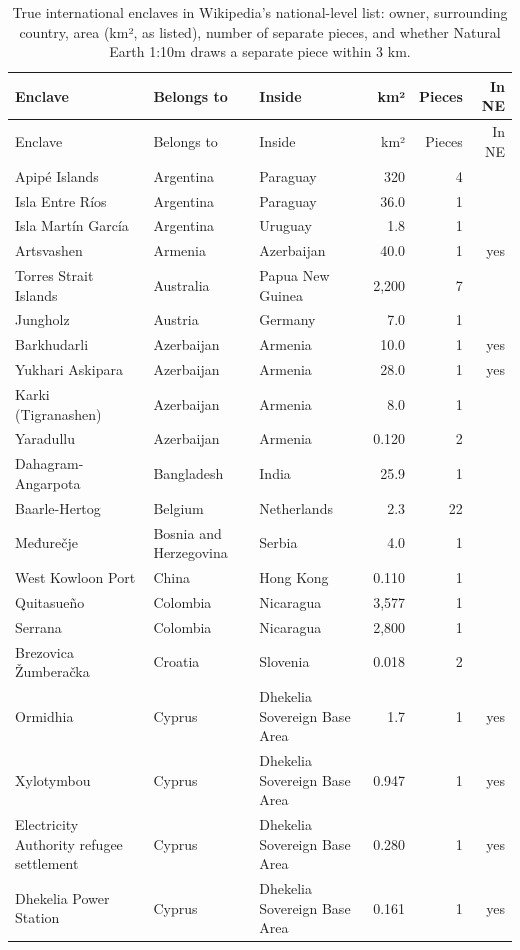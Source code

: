 \documentclass[11pt,a4paper]{article}
\begin{document}
\begin{longtable}{p{4.0cm}p{2.7cm}p{2.9cm}rrr}\caption{True international enclaves in Wikipedia's national-level list: owner, surrounding country, area (km², as listed), number of separate pieces, and whether Natural Earth 1:10m draws a separate piece within 3 km.}\label{tab:enclaves}\\\toprule Enclave & Belongs to & Inside & km² & Pieces & In NE\\\midrule\endfirsthead
\toprule Enclave & Belongs to & Inside & km² & Pieces & In NE\\\midrule\endhead
Apipé Islands & Argentina & Paraguay & 320 & 4 & \\
Isla Entre Ríos & Argentina & Paraguay & 36.0 & 1 & \\
Isla Martín García & Argentina & Uruguay & 1.8 & 1 & \\
Artsvashen & Armenia & Azerbaijan & 40.0 & 1 & yes\\
Torres Strait Islands & Australia & Papua New Guinea & 2,200 & 7 & \\
Jungholz & Austria & Germany & 7.0 & 1 & \\
Barkhudarli & Azerbaijan & Armenia & 10.0 & 1 & yes\\
Yukhari Askipara & Azerbaijan & Armenia & 28.0 & 1 & yes\\
Karki (Tigranashen) & Azerbaijan & Armenia & 8.0 & 1 & \\
Yaradullu & Azerbaijan & Armenia & 0.120 & 2 & \\
Dahagram-Angarpota & Bangladesh & India & 25.9 & 1 & \\
Baarle-Hertog & Belgium & Netherlands & 2.3 & 22 & \\
Međurečje & Bosnia and Herzegovina & Serbia & 4.0 & 1 & \\
West Kowloon Port & China & Hong Kong & 0.110 & 1 & \\
Quitasueño & Colombia & Nicaragua & 3,577 & 1 & \\
Serrana & Colombia & Nicaragua & 2,800 & 1 & \\
Brezovica Žumberačka & Croatia & Slovenia & 0.018 & 2 & \\
Ormidhia & Cyprus & Dhekelia Sovereign Base Area & 1.7 & 1 & yes\\
Xylotymbou & Cyprus & Dhekelia Sovereign Base Area & 0.947 & 1 & yes\\
Electricity Authority refugee settlement & Cyprus & Dhekelia Sovereign Base Area & 0.280 & 1 & yes\\
Dhekelia Power Station & Cyprus & Dhekelia Sovereign Base Area & 0.161 & 1 & yes\\

\end{longtable}
\end{document}
